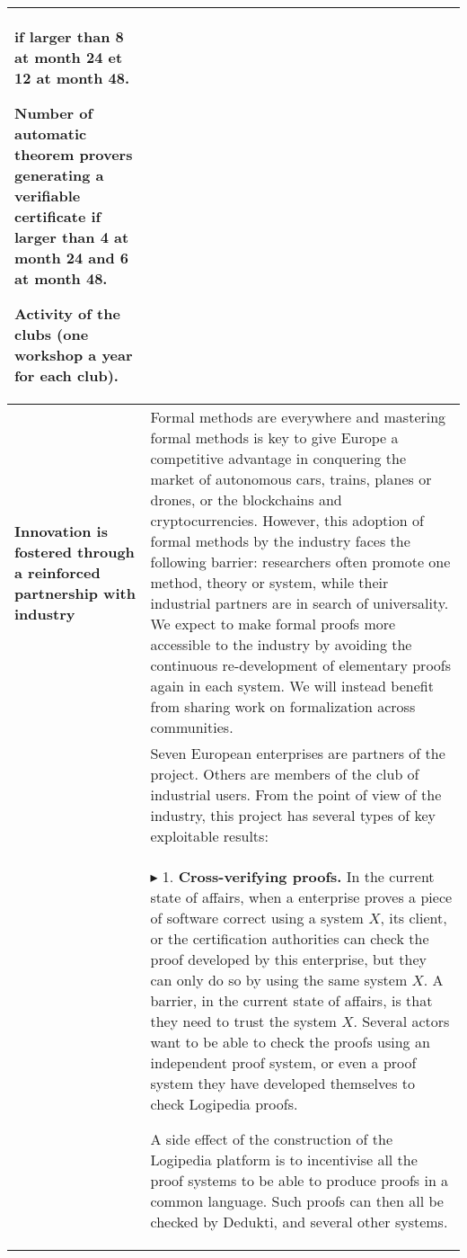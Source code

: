 \begin{longtable}{|p{}|p{}|}
\begin{compactitem}
if larger than 8 at month 24 et 12 at month 48.
\item Number of automatic theorem provers generating a verifiable certificate
if larger than 4 at month 24 and 6 at month 48. 
\item Activity of the clubs (one workshop a year for each club).
\end{compactitem}
\\
\hline
{\bf Innovation is fostered through a reinforced partnership
with industry}
&
Formal methods are everywhere and mastering formal methods is key to
give Europe a competitive advantage in conquering the market of
autonomous cars, trains, planes or drones, or the blockchains and
cryptocurrencies. However, this adoption of formal methods by the
industry faces the following barrier: researchers often promote one
method, theory or system, while their industrial partners are in
search of universality.  We expect to make formal proofs more
accessible to the industry by avoiding
the continuous re-development of 
elementary
proofs again in each system. We will instead benefit from sharing work on
formalization across communities.
\\

&
\hspace{0.4cm}
Seven European enterprises are partners of the project.
Others are members of the club of
industrial users.  From the point of view of the industry, this
project has several types of key exploitable results:\\
&
$\blacktriangleright$
1. {\bf Cross-verifying proofs.}
In the current state of affairs, when a enterprise proves a piece of
software correct using a system $X$, its client, or the certification
authorities can check the proof developed by this enterprise, but they
can only do so by using the same system $X$. A barrier,
in the current state of affairs, 
is that they need to trust the system $X$.
Several actors want to be able to check the proofs using an
independent proof system, or even a proof system they have developed
themselves to check Logipedia proofs.

A side effect of the construction of the Logipedia platform is
to incentivise all the proof systems to be able to produce proofs in a
common language. Such proofs can then all be checked by
Dedukti, and several other systems.


\end{longtable}
